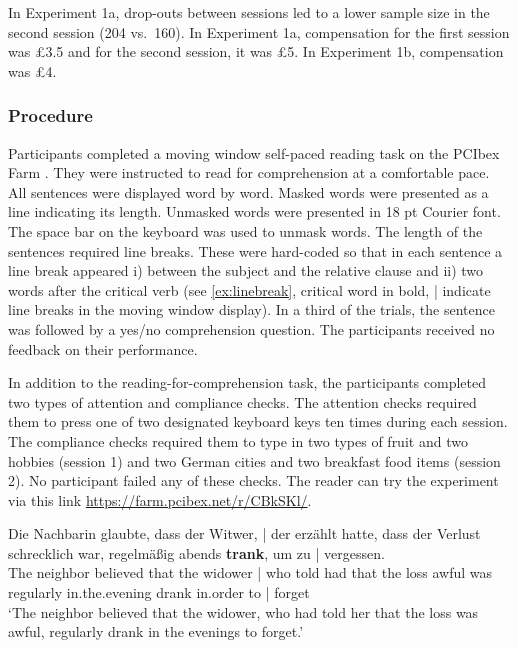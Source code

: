 \documentclass[a4paper, man, floatsintext]{apa7}
\begin{document}
In Experiment 1a, drop-outs between sessions led to a lower sample size in the second session (204 vs.\ 160). In Experiment 1a, compensation for the first session was \pounds 3.5 and for the second session, it was \pounds 5. In Experiment 1b, compensation was \pounds 4. 

\subsubsection{Procedure}
Participants completed a moving window self-paced reading task \citep{just_etal_1982} on the PCIbex Farm \citep{pcibex}. They were instructed to read for comprehension at a comfortable pace. All sentences were displayed word by word. Masked words were presented as a line indicating its length. Unmasked words were presented in 18 pt Courier font. The space bar on the keyboard was used to unmask words. The length of the sentences required line breaks. These were hard-coded so that in each sentence a line break appeared i) between the subject and the relative clause and ii) two words after the critical verb (see \ref{ex:linebreak}, critical word in bold, | indicate line breaks in the moving window display). In a third of the trials, the sentence was followed by a yes/no comprehension question. The participants received no feedback on their performance.

In addition to the reading-for-comprehension task, the participants completed two types of attention and compliance checks. The attention checks required them to press one of two designated keyboard keys ten times during each session. The compliance checks required them to type in two types of fruit and two hobbies (session 1) and two German cities and two breakfast food items (session 2). No participant failed any of these checks. The reader can try the experiment via this link \hyperlink{https://farm.pcibex.net/r/CBkSKl/}{https://farm.pcibex.net/r/CBkSKl/}. 

\begin{exe}  
\ex \label{ex:linebreak}
    \gll Die Nachbarin glaubte, dass der Witwer, | der erzählt hatte, dass der Verlust schrecklich war, regelmäßig abends \textbf{trank}, um zu | vergessen. \\ 
    The neighbor believed that the widower | who told had that the loss awful was regularly in.the.evening drank in.order to | forget\\
    \trans  `The neighbor believed that the widower, who had told her that the loss was awful, regularly drank in the evenings to forget.'\\  
\end{exe}
\end{document}
